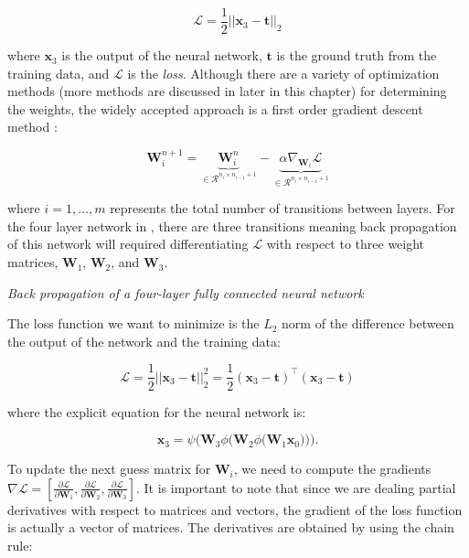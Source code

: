 \begin{equation}
    \mathcal{L} = \frac{1}{2}|| \boldsymbol{x}_3 - \boldsymbol{t}||_2
\end{equation}

where $\boldsymbol{x}_3$ is the output of the neural network, $\boldsymbol{t}$ is the ground truth from the training data, and $\mathcal{L}$ is the \textit{loss}. Although there are a variety of optimization methods  (more methods are discussed in later in this chapter) for determining the weights, the widely accepted approach is a first order gradient descent method \cite{kochenderfer2019algorithms}: 

\begin{equation}
    \boldsymbol{W}^{n+1}_i = \underbrace{\boldsymbol{W}^{n}_i}_{\in \mathcal{R}^{n_i \times n_{i-1} + 1}} - \underbrace{\alpha  \nabla_{\boldsymbol{W}_i} \mathcal{L}}_{\in \mathcal{R}^{n_i \times n_{i-1} + 1}}
\end{equation}

where $i = 1, \dots, m$ represents the total number of transitions between layers. For the four layer network in , there are three transitions meaning back propagation of this network will required differentiating $\mathcal{L}$ with respect to three weight matrices, $\boldsymbol{W}_1$, $\boldsymbol{W}_2$, and $\boldsymbol{W}_3$. 

\vspace{0.5cm}
\noindent\textit{Back propagation of a four-layer fully connected neural network}
\vspace{0.25cm}

The loss function we want to minimize is the $L_2$ norm of the difference between the output of the network and the training data: 

\begin{equation}
    \mathcal{L} = \frac{1}{2}||\boldsymbol{x}_3 - \boldsymbol{t}||_2^2 = \frac{1}{2} (\boldsymbol{x}_3 - \boldsymbol{t})^\top (\boldsymbol{x}_3 - \boldsymbol{t})
\end{equation}

where the explicit equation for the neural network is: 

\begin{equation}
    \boldsymbol{x}_3 = \psi\Bigg(\boldsymbol{W}_3 \phi\bigg(\boldsymbol{W}_2 \phi\big(\boldsymbol{W}_1 \boldsymbol{x}_0\big)\bigg)\Bigg). 
\end{equation}

To update the next guess matrix for $\boldsymbol{W}_i$, we need to compute the gradients $\nabla \mathcal{L} = [\frac{\partial \mathcal{L}}{\partial \boldsymbol{W}_1}, \frac{\partial \mathcal{L}}{\partial \boldsymbol{W}_2}, \frac{\partial \mathcal{L}}{\partial \boldsymbol{W}_3}]$. It is important to note that since we are dealing partial derivatives with respect to matrices and vectors, the gradient of the loss function is actually a vector of matrices. The derivatives are obtained by using the chain rule: 

